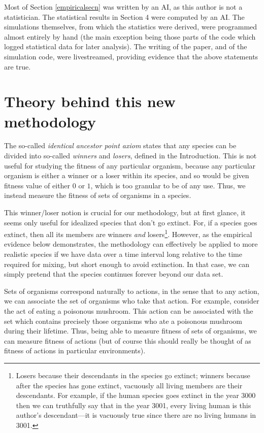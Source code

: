 \documentclass{article}
\begin{document}
Most of Section \ref{empiricalsecn} was written by an AI, as this author
is not a statistician. The statistical results in Section 4 were computed
by an AI. The simulations themselves, from which the statistics were derived,
were programmed almost entirely by hand (the main exception being those parts
of the code which logged statistical data for later analysis). The writing
of the paper, and of the simulation code, were livestreamed, providing evidence
that the above statements are true.

\section{Theory behind this new methodology}
\label{theoryscn}


The so-called \emph{identical ancestor point axiom} states that any species can be
divided into
so-called \emph{winners} and \emph{losers}, defined in the
Introduction. This is not useful for studying the fitness of any particular
organism, because any particular organism is either a winner or a loser within
its species, and so would be given fitness value of either $0$ or $1$, which is
too granular to be of any use. Thus, we instead measure the fitness of sets of
organisms in a species.

This winner/loser notion
is crucial for our methodology, but at first glance,
it seems only useful for idealized species
that don't go extinct. For, if a species goes extinct, then all its
members are winners \emph{and} losers\footnote{Losers because their
descendants in the species go extinct; winners because after the
species has gone extinct, vacuously all living members are their
descendants. For example, if the human species goes extinct in the
year 3000 then we can truthfully say that in the year 3001, every
living human is this author's descendant---it is vacuously true
since there are no living humans in 3001.}. However,
as the empirical evidence below demonstrates, the methodology can
effectively be applied to more realistic species if we have data
over a time interval long relative to the time
required for mixing, but short enough to avoid extinction.
In that case, we can simply pretend that the species continues forever
beyond our data set.

Sets of organisms correspond naturally to actions, in the sense that
to any action, we can associate the set of organisms who take that action.
For example, consider the act of eating a poisonous mushroom.
This action can be associated with the set which contains precisely those
organisms who ate a poisonous mushroom during their lifetime.
Thus, being able to measure fitness of sets of organisms, we can measure
fitness of actions (but of course this should really be thought of as
fitness of actions in particular environments).
\end{document}

